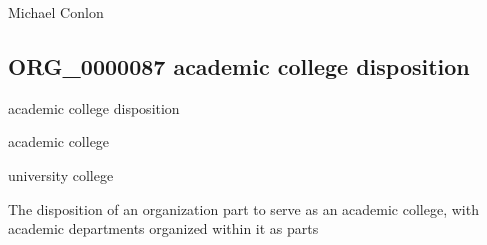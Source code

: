 \documentclass[letterpaper,10pt,english]{sphinxmanual}
\begin{document}
\begin{sphinxShadowBox}

\sphinxAtStartPar
Michael Conlon 
\end{sphinxShadowBox}
\begin{quote}

\ignorespaces \end{quote}


\subsection{ORG\_0000087 \sphinxhyphen{} academic college disposition}
\label{\detokenize{doc-ORG_0000087:org-0000087-academic-college-disposition}}\label{\detokenize{doc-ORG_0000087:index-0}}\label{\detokenize{doc-ORG_0000087::doc}}
\begin{sphinxShadowBox}

\sphinxAtStartPar
academic college disposition
\end{sphinxShadowBox}

\begin{sphinxShadowBox}

\sphinxAtStartPar
academic college
\end{sphinxShadowBox}

\begin{sphinxShadowBox}

\sphinxAtStartPar
university college
\end{sphinxShadowBox}

\begin{sphinxShadowBox}

\sphinxAtStartPar
{\hyperref[\detokenize{doc-BFO_0000016::doc}]{}}
\end{sphinxShadowBox}

\begin{sphinxShadowBox}

\sphinxAtStartPar
The disposition of an organization part to serve as an academic college, with academic departments organized within it as parts
\end{sphinxShadowBox}
\end{document}
